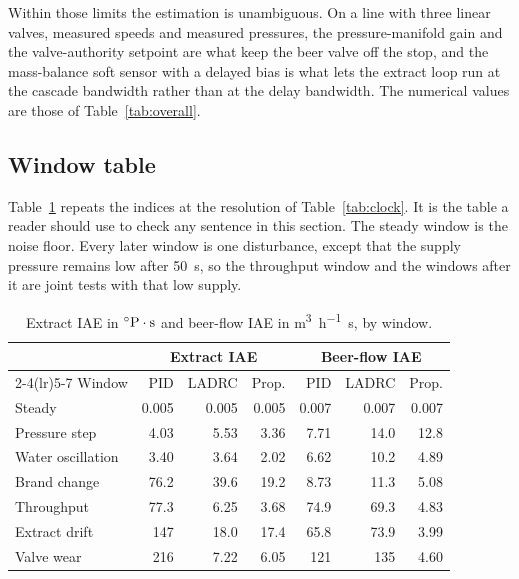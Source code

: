 Within those limits the estimation is unambiguous. On a line with three linear valves, measured speeds and measured pressures, the pressure-manifold gain and the valve-authority setpoint are what keep the beer valve off the stop, and the mass-balance soft sensor with a delayed bias is what lets the extract loop run at the cascade bandwidth rather than at the delay bandwidth. The numerical values are those of Table~\ref{tab:overall}.

\subsection{Window table}

Table~\ref{tab:windows} repeats the indices at the resolution of Table~\ref{tab:clock}. It is the table a reader should use to check any sentence in this section. The steady window is the noise floor. Every later window is one disturbance, except that the supply pressure remains low after \SI{50}{s}, so the throughput window and the windows after it are joint tests with that low supply.

\begin{table}[htbp]
\centering
\caption{Extract IAE in $^{\circ}\mathrm{P}\cdot\mathrm{s}$ and beer-flow IAE in \si{\cubic\metre\per\hour\second}, by window.}
\label{tab:windows}
\begin{tabular}{@{}lrrrrrr@{}}
\toprule
 & \multicolumn{3}{c}{Extract IAE} & \multicolumn{3}{c}{Beer-flow IAE} \\
\cmidrule(lr){2-4}\cmidrule(lr){5-7}
Window & PID & LADRC & Prop. & PID & LADRC & Prop. \\
\midrule
Steady & 0.005 & 0.005 & 0.005 & 0.007 & 0.007 & 0.007 \\
Pressure step & 4.03 & 5.53 & 3.36 & 7.71 & 14.0 & 12.8 \\
Water oscillation & 3.40 & 3.64 & 2.02 & 6.62 & 10.2 & 4.89 \\
Brand change & 76.2 & 39.6 & 19.2 & 8.73 & 11.3 & 5.08 \\
Throughput & 77.3 & 6.25 & 3.68 & 74.9 & 69.3 & 4.83 \\
Extract drift & 147 & 18.0 & 17.4 & 65.8 & 73.9 & 3.99 \\
Valve wear & 216 & 7.22 & 6.05 & 121 & 135 & 4.60 \\
\bottomrule
\end{tabular}
\end{table}

